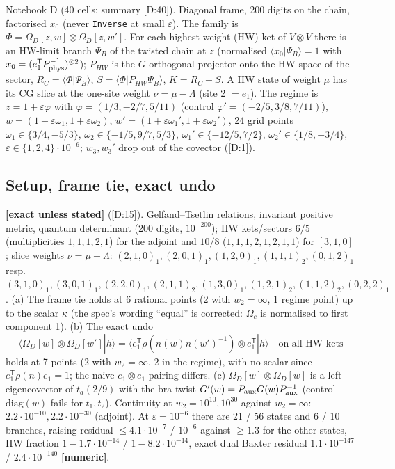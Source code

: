 \documentclass[10pt]{article}
\newcommand{\cl}[2]{\textsf{[#1:#2]}}
\newcommand{\tg}[1]{\textbf{[#1]}}
\newcommand{\Om}{\Omega}
\begin{document}
Notebook D (40 cells; summary \cl{D}{40}). Diagonal frame, 200 digits on the chain, factorised $x_0$ (never \texttt{Inverse} at small $\varepsilon$). The family is $\Phi=\Om_D[z,w]\otimes\Om_D[z,w']$. For each highest-weight (HW) ket of $V\otimes V$ there is an HW-limit branch $\Psi_B$ of the twisted chain at $z$ (normalised $\langle x_0|\Psi_B\rangle=1$ with $x_0=(e_1^{\mathsf T}P_{\rm phys}^{-1})^{\otimes2}$); $P_{HW}$ is the $G$-orthogonal projector onto the HW space of the sector, $R_C=\langle\Phi|\Psi_B\rangle$, $S=\langle\Phi|P_{HW}\Psi_B\rangle$, $K=R_C-S$. A HW state of weight $\mu$ has its CG slice at the one-site weight $\nu=\mu-\Lambda$ (site 2 $=e_1$). The regime is $z=1+\varepsilon\varphi$ with $\varphi=(1/3,-2/7,5/11)$ (control $\varphi'=(-2/5,3/8,7/11)$), $w=(1+\varepsilon\omega_1,1+\varepsilon\omega_2)$, $w'=(1+\varepsilon\omega_1',1+\varepsilon\omega_2')$, 24 grid points $\omega_1\in\{3/4,-5/3\}$, $\omega_2\in\{-1/5,9/7,5/3\}$, $\omega_1'\in\{-12/5,7/2\}$, $\omega_2'\in\{1/8,-3/4\}$, $\varepsilon\in\{1,2,4\}\cdot10^{-6}$; $w_3,w_3'$ drop out of the covector (\cl{D}{1}).

\subsection{Setup, frame tie, exact undo}\label{sec:Dsetup}

\tg{exact unless stated} (\cl{D}{15}). Gelfand--Tsetlin relations, invariant positive metric, quantum determinant (200 digits, $10^{-200}$); HW kets/sectors $6/5$ (multiplicities $1,1,1,2,1$) for the adjoint and $10/8$ ($1,1,1,2,1,2,1,1$) for $[3,1,0]$; slice weights $\nu=\mu-\Lambda$: $(2,1,0)_1,(2,0,1)_1,(1,2,0)_1,(1,1,1)_2,(0,1,2)_1$ resp.\ $(3,1,0)_1,(3,0,1)_1,(2,2,0)_1,(2,1,1)_2,(1,3,0)_1,(1,2,1)_2,(1,1,2)_2,(0,2,2)_1$. (a) The frame tie holds at 6 rational points (2 with $w_2=\infty$, 1 regime point) up to the scalar $\kappa$ (the spec's wording ``equal'' is corrected: $\Om_c$ is normalised to first component 1). (b) The exact undo
\[
\langle\Om_D[w]\otimes\Om_D[w']|h\rangle=\langle e_1^{\mathsf T}\rho(n(w)n(w')^{-1})\otimes e_1^{\mathsf T}|h\rangle\quad\text{on all HW kets}
\]
holds at 7 points (2 with $w_2=\infty$, 2 in the regime), with no scalar since $e_1^{\mathsf T}\rho(n)e_1=1$; the naive $e_1\otimes e_1$ pairing differs. (c) $\Om_D[w]\otimes\Om_D[w]$ is a left eigencovector of $t_a(2/9)$ with the bra twist $G'(w)=P_{\rm aux}G(w)P_{\rm aux}^{-1}$ (control $\mathrm{diag}(w)$ fails for $t_1,t_2$). Continuity at $w_2=10^{10},10^{30}$ against $w_2=\infty$: $2.2\cdot10^{-10},2.2\cdot10^{-30}$ (adjoint). At $\varepsilon=10^{-6}$ there are 21 / 56 states and 6 / 10 branches, raising residual $\le4.1\cdot10^{-7}$ / $10^{-6}$ against $\ge1.3$ for the other states, HW fraction $1-1.7\cdot10^{-14}$ / $1-8.2\cdot10^{-14}$, exact dual Baxter residual $1.1\cdot10^{-147}$ / $2.4\cdot10^{-140}$ \tg{numeric}.
\end{document}
